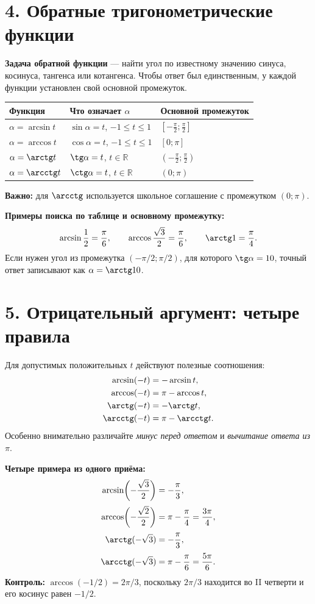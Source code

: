 \documentclass[a4paper,12pt]{article}
\newcommand{\sectionline}{\par\vspace{-2mm}{\color{accent}\rule{\linewidth}{0.35pt}}\par\vspace{2mm}}
\newcommand{\topic}[1]{\section*{\normalfont\color{darkaccent}#1}\sectionline}
\newcommand{\key}[1]{\textcolor{darkaccent}{#1}}
\begin{document}
\topic{4. Обратные тригонометрические функции}
\textbf{Задача обратной функции} --- найти угол по известному значению синуса, косинуса, тангенса или котангенса. Чтобы ответ был единственным, у каждой функции установлен свой \key{основной промежуток}.

\begingroup\small
\renewcommand{\arraystretch}{1.5}
\begin{center}
\begin{tabularx}{\linewidth}{@{}l X X@{}}
\toprule
Функция & Что означает $\alpha$ & Основной промежуток \\
\midrule
$\alpha=\arcsin t$ & $\sin\alpha=t$, $-1\le t\le1$ & $\left[-\frac\pi2;\frac\pi2\right]$ \\
$\alpha=\arccos t$ & $\cos\alpha=t$, $-1\le t\le1$ & $[0;\pi]$ \\
$\alpha=\arctg t$ & $\tg\alpha=t$, $t\in\mathbb R$ & $\left(-\frac\pi2;\frac\pi2\right)$ \\
$\alpha=\arcctg t$ & $\ctg\alpha=t$, $t\in\mathbb R$ & $(0;\pi)$ \\
\bottomrule
\end{tabularx}
\end{center}
\endgroup
\textbf{Важно:} для $\arcctg$ используется школьное соглашение с промежутком $(0;\pi)$.

\textbf{Примеры поиска по таблице и основному промежутку:}
\[
\arcsin\frac12=\frac\pi6,\qquad
\arccos\frac{\sqrt3}{2}=\frac\pi6,\qquad
\arctg1=\frac\pi4.
\]
Если нужен угол из промежутка $(-\pi/2;\pi/2)$, для которого $\tg\alpha=10$, точный ответ записывают как $\alpha=\arctg10$.

\topic{5. Отрицательный аргумент: четыре правила}
Для допустимых положительных $t$ действуют полезные соотношения:
\begin{align*}
\arcsin(-t)&=-\arcsin t,\\
\arccos(-t)&=\pi-\arccos t,\\
\arctg(-t)&=-\arctg t,\\
\arcctg(-t)&=\pi-\arcctg t.
\end{align*}
Особенно внимательно различайте \emph{минус перед ответом} и \emph{вычитание ответа из $\pi$}.

\textbf{Четыре примера из одного приёма:}
\begin{align*}
\arcsin\!\left(-\frac{\sqrt3}{2}\right)&=-\frac\pi3,\\[2pt]
\arccos\!\left(-\frac{\sqrt2}{2}\right)&=\pi-\frac\pi4=\frac{3\pi}{4},\\[2pt]
\arctg(-\sqrt3)&=-\frac\pi3,\\[2pt]
\arcctg(-\sqrt3)&=\pi-\frac\pi6=\frac{5\pi}{6}.
\end{align*}
\textbf{Контроль:} $\arccos(-1/2)=2\pi/3$, поскольку $2\pi/3$ находится во II четверти и его косинус равен $-1/2$.
\end{document}

